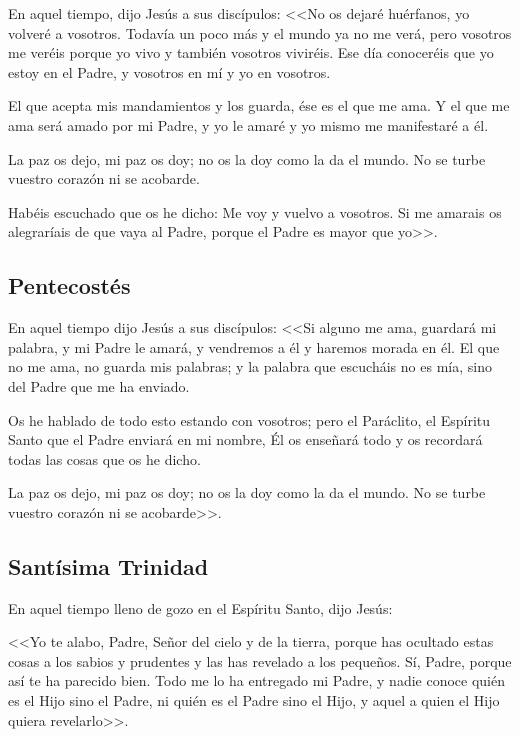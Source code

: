  En aquel tiempo, dijo Jesús a sus discípulos: 
<<No os dejaré huérfanos, yo volveré a 
vosotros. Todavía un poco más y el mundo ya 
no me verá, pero vosotros me veréis porque yo 
vivo y también vosotros viviréis. Ese día 
conoceréis que yo estoy en el Padre, y vosotros 
en mí y yo en vosotros. 

El que acepta mis 
mandamientos y los guarda, ése es el que me 
ama. Y el que me ama será amado por mi 
Padre, y yo le amaré y yo mismo me 
manifestaré a él. 

La paz os dejo, mi paz os doy; 
no os la doy como la da el mundo. No se turbe 
vuestro corazón ni se acobarde. 

Habéis 
escuchado que os he dicho: Me voy y vuelvo a 
vosotros. Si me amarais os alegraríais de que 
vaya al Padre, porque el Padre es mayor que 
yo>>. 


\subsection{Pentecostés }



 En aquel tiempo dijo Jesús a sus discípulos: 
<<Si alguno me ama, guardará mi palabra, y mi 
Padre le amará, y vendremos a él y haremos 
morada en él. El que no me ama, no guarda 
mis palabras; y la palabra que escucháis no es 
mía, sino del Padre que me ha enviado. 

Os he 
hablado de todo esto estando con vosotros; 
pero el Paráclito, el Espíritu Santo que el Padre 
enviará en mi nombre, Él os enseñará todo y 
os recordará todas las cosas que os he dicho. 

La paz os dejo, mi paz os doy; no os la doy 
como la da el mundo. No se turbe vuestro 
corazón ni se acobarde>>. 


\subsection{Santísima Trinidad }



 En aquel tiempo lleno de gozo en el Espíritu 
Santo, dijo Jesús: 

<<Yo te alabo, Padre, Señor 
del cielo y de la tierra, porque has ocultado 
estas cosas a los sabios y prudentes y las has 
revelado a los pequeños. Sí, Padre, porque así 
te ha parecido bien. Todo me lo ha entregado 
mi Padre, y nadie conoce quién es el Hijo sino 
el Padre, ni quién es el Padre sino el Hijo, y 
aquel a quien el Hijo quiera revelarlo>>. 

